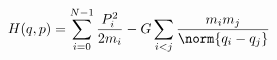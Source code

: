 \documentclass[preview]{standalone}
\begin{document}
\begin{align*}
\special{dvisvgm:raw <g id='unique000'>}H(q,p) = \sum_{i=0}^{N-1}\frac{P^2_i}{2m_i} - G \sum_{i<j} \frac{m_i m_j}{\norm{q_i - q_j}}\special{dvisvgm:raw </g>}
\end{align*}
\end{document}
